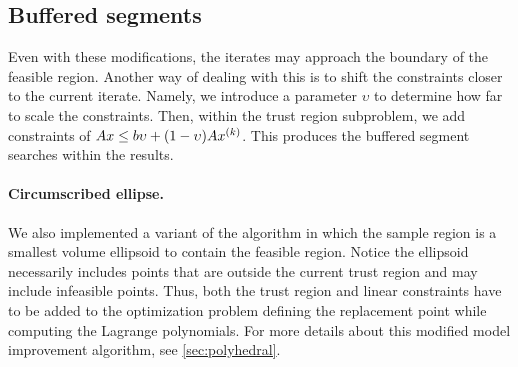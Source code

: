 \documentclass{article}
\begin{document}
%


\pagebreak

\subsection{Buffered segments}

Even with these modifications, the iterates may approach the boundary of the feasible region.
Another way of dealing with this is to shift the constraints closer to the current iterate.
Namely, we introduce a parameter $\upsilon$ to determine how far to scale the constraints.
Then, within the trust region subproblem, we add constraints of $Ax \le b\upsilon + (1-\upsilon) A x^{(k)} $.
This produces the buffered segment searches within the results.

\paragraph*{Circumscribed ellipse.}

We also implemented a variant of the algorithm in which the sample region is a smallest volume ellipsoid to contain the feasible region.
Notice the ellipsoid necessarily includes points that are outside the current trust region and may include infeasible points.
Thus, both the trust region and linear constraints have to be added to the optimization problem defining the replacement point while computing the Lagrange polynomials.
For more details about this modified model improvement algorithm, see \cref{sec:polyhedral}.
\end{document}

